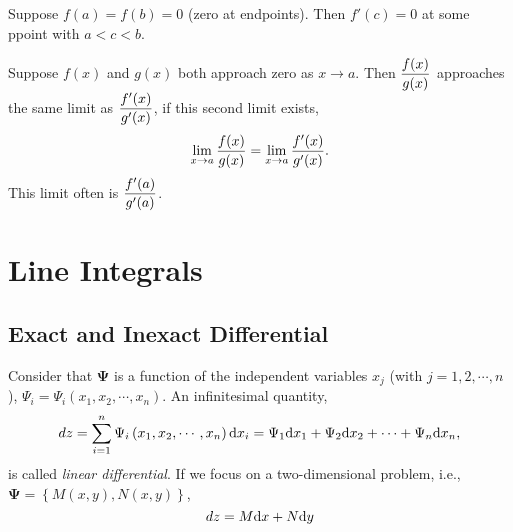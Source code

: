 \begin{theorem}
   Suppose $f(a) = f(b) = 0$ (zero at endpoints). Then $f'(c) = 0$ at some ppoint with $a<c<b$.
\end{theorem}

\begin{theorem}
   Suppose $f(x)$ and $g(x)$ both approach zero as $x\rightarrow a$. Then $\displaystyle\frac{f(x)}{g(x)}$ approaches the same limit as $\displaystyle\frac{f'(x)}{g'(x)}$, if this second limit exists,
    \begin{equation}
        \lim_{x\rightarrow a}\displaystyle\frac{f(x)}{g(x)} = \lim_{x\rightarrow a}\displaystyle\frac{f'(x)}{g'(x)}.
    \end{equation}
   This limit often is $\displaystyle\frac{f'(a)}{g'(a)}$.
\end{theorem}

\section{Line Integrals}

\subsection{Exact and Inexact Differential}
Consider that $\mathbf{\Psi}$ is a function of the independent variables $x_{j}$ (with $j=1,2,\cdots,n$),  $\Psi_{i}=\Psi_{i}\left(x_{1},x_{2},\cdots,x_{n}\right)$. An infinitesimal quantity,
   \begin{displaymath}
      dz = \sum\limits_{i=1}^{n} \Psi_{i}\left(x_{1},x_{2},\cdots,x_{n}\right)\mathrm{d}{x_{i}} =  \Psi_{1}\mathrm{d}{x_{1}} + \Psi_{2}\mathrm{d}{x_{2}} +\cdots + \Psi_{n}\mathrm{d}{x_{n}},
   \end{displaymath}
is called {\it linear differential}. If we focus on a two-dimensional problem, i.e., $\mathbf{\Psi}=\left\{M(x,y),N(x,y)\right\}$,
   \begin{equation}
      dz = M\mathrm{d}{x} + N\mathrm{d}{y}\label{Appendix_Calculus:Eqn:ExactLinearDifferential}
   \end{equation}

